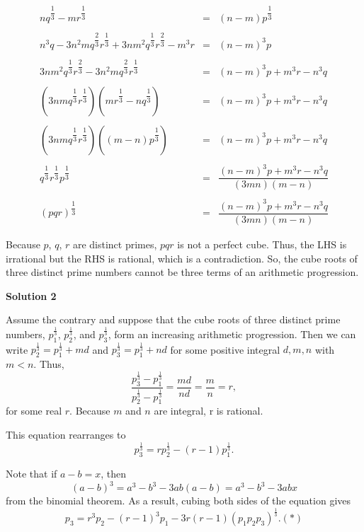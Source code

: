 \begin{enumerate}
 
 \[\begin{array}{rcl} nq^{\dfrac{1}{3}}-mr^{\dfrac{1}{3}}&=&(n-m)p^{\dfrac{1}{3}} \\  \\n^{3}q-3n^{2}mq^{\dfrac{2}{3}}r^{\dfrac{1}{3}}+3nm^{2}q^{\dfrac{1}{3}}r^{\dfrac{2}{3}}-m^{3}r&=&(n-m)^{3}p\\  \\3nm^{2}q^{\dfrac{1}{3}}r^{\dfrac{2}{3}}-3n^{2}mq^{\dfrac{2}{3}}r^{\dfrac{1}{3}}&=&(n-m)^{3}p+m^{3}r-n^{3}q\\  \\(3nmq^{\dfrac{1}{3}}r^{\dfrac{1}{3}})(mr^{\dfrac{1}{3}}-nq^{\dfrac{1}{3}})&=&(n-m)^{3}p+m^{3}r-n^{3}q\\  \\(3nmq^{\dfrac{1}{3}}r^{\dfrac{1}{3}})((m-n)p^{\dfrac{1}{3}})&=&(n-m)^{3}p+m^{3}r-n^{3}q\\  \\q^{\dfrac{1}{3}}r^{\dfrac{1}{3}}p^{\dfrac{1}{3}}&=&\dfrac{(n-m)^{3}p+m^{3}r-n^{3}q}{(3mn)(m-n)}\\  \\(pqr)^{\dfrac{1}{3}}&=&\dfrac{(n-m)^{3}p+m^{3}r-n^{3}q}{(3mn)(m-n)} \end{array}\]

 Because $p$, $q$, $r$ are distinct primes, $pqr$ is not a perfect cube. Thus, the LHS is irrational but the RHS is rational, which is a contradiction. So, the cube roots of three distinct prime numbers cannot be three terms of an arithmetic progression.

 



\textbf{Solution 2}

Assume the contrary and suppose that the cube roots of three distinct prime numbers, $p_1^\frac{1}{3}$, $p_2^\frac{1}{3}$, and $p_3^\frac{1}{3}$, form an increasing arithmetic progression. Then we can write $p_2^\frac{1}{3} = p_1^\frac{1}{3} + md$ and $p_3^\frac{1}{3} = p_1^\frac{1}{3} + nd$ for some positive integral $d, m, n$ with $m < n$. Thus,
 \[\frac{p_3^\frac{1}{3} - p_1^\frac{1}{3}}{p_2^\frac{1}{3} - p_1^\frac{1}{3}} = \frac{md}{nd} = \frac{m}{n} = r,\]for some real $r$. Because $m$ and $n$ are integral, r is rational.

 This equation rearranges to 
 \[p_3^\frac{1}{3} = rp_2^\frac{1}{3} - (r-1)p_1^\frac{1}{3}.\]

 Note that if $a-b=x$, then 
 \[(a-b)^3 = a^3 - b^3 - 3ab(a-b) = a^3 - b^3 - 3abx\] from the binomial theorem. As a result, cubing both sides of the equation gives
 \[p_3 = r^3p_2 - (r-1)^3p_1 - 3r(r-1)(p_1p_2p_3)^\frac{1}{3}.     (*)\]


\end{enumerate}
